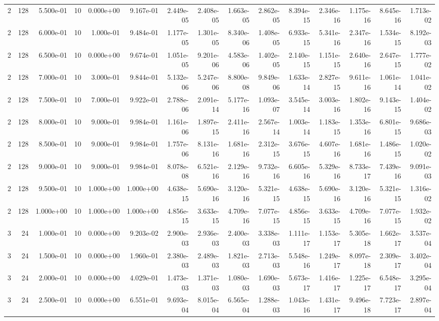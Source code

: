 \begin{tabular}{rrrrrrrrrrrrrrr}
2 & 128 & 5.500e-01 & 10 & 0.000e+00 & 9.167e-01 & 2.449e-05 & 2.408e-05 & 1.663e-05 & 2.862e-05 & 8.394e-15 & 2.346e-16 & 1.175e-16 & 8.645e-16 & 1.713e-02 \\
2 & 128 & 6.000e-01 & 10 & 1.000e-01 & 9.484e-01 & 1.177e-05 & 1.301e-05 & 8.340e-06 & 1.408e-05 & 6.933e-15 & 5.341e-16 & 2.347e-16 & 1.534e-15 & 8.192e-03 \\
2 & 128 & 6.500e-01 & 10 & 0.000e+00 & 9.674e-01 & 1.051e-05 & 9.201e-06 & 4.583e-06 & 1.402e-05 & 2.140e-15 & 1.151e-15 & 2.640e-16 & 2.647e-15 & 1.777e-02 \\
2 & 128 & 7.000e-01 & 10 & 3.000e-01 & 9.844e-01 & 5.132e-06 & 5.247e-06 & 8.800e-08 & 9.849e-06 & 1.633e-14 & 2.827e-15 & 9.611e-16 & 1.061e-14 & 1.041e-02 \\
2 & 128 & 7.500e-01 & 10 & 7.000e-01 & 9.922e-01 & 2.788e-06 & 2.091e-14 & 5.177e-16 & 1.093e-07 & 3.545e-14 & 3.003e-16 & 1.802e-16 & 9.143e-15 & 1.404e-02 \\
2 & 128 & 8.000e-01 & 10 & 9.000e-01 & 9.984e-01 & 1.161e-06 & 1.897e-15 & 2.411e-16 & 2.567e-14 & 1.003e-14 & 1.183e-15 & 1.353e-16 & 6.801e-15 & 9.686e-03 \\
2 & 128 & 8.500e-01 & 10 & 9.000e-01 & 9.984e-01 & 1.757e-06 & 8.131e-16 & 1.681e-16 & 2.312e-15 & 3.676e-15 & 4.607e-16 & 1.681e-16 & 1.486e-15 & 1.020e-02 \\
2 & 128 & 9.000e-01 & 10 & 9.000e-01 & 9.984e-01 & 8.078e-08 & 6.521e-16 & 2.129e-16 & 9.732e-16 & 6.605e-16 & 5.329e-16 & 8.733e-17 & 7.439e-16 & 9.091e-03 \\
2 & 128 & 9.500e-01 & 10 & 1.000e+00 & 1.000e+00 & 4.638e-15 & 5.690e-16 & 3.120e-16 & 5.321e-15 & 4.638e-15 & 5.690e-16 & 3.120e-16 & 5.321e-15 & 1.316e-02 \\
2 & 128 & 1.000e+00 & 10 & 1.000e+00 & 1.000e+00 & 4.856e-15 & 3.633e-15 & 4.709e-16 & 7.077e-15 & 4.856e-15 & 3.633e-15 & 4.709e-16 & 7.077e-15 & 1.932e-02 \\
3 & 24 & 1.000e-01 & 10 & 0.000e+00 & 9.203e-02 & 2.900e-03 & 2.936e-03 & 2.400e-03 & 3.338e-03 & 1.111e-17 & 1.153e-17 & 5.305e-18 & 1.662e-17 & 3.537e-04 \\
3 & 24 & 1.500e-01 & 10 & 0.000e+00 & 1.960e-01 & 2.380e-03 & 2.489e-03 & 1.821e-03 & 2.713e-03 & 5.548e-16 & 1.249e-17 & 8.097e-18 & 2.309e-17 & 3.402e-04 \\
3 & 24 & 2.000e-01 & 10 & 0.000e+00 & 4.029e-01 & 1.473e-03 & 1.371e-03 & 1.080e-03 & 1.690e-03 & 5.673e-17 & 1.416e-17 & 1.225e-17 & 6.548e-17 & 3.295e-04 \\
3 & 24 & 2.500e-01 & 10 & 0.000e+00 & 6.551e-01 & 9.693e-04 & 8.015e-04 & 6.565e-04 & 1.288e-03 & 1.043e-16 & 1.431e-17 & 9.496e-18 & 7.723e-17 & 2.897e-04 \\

\end{tabular}
